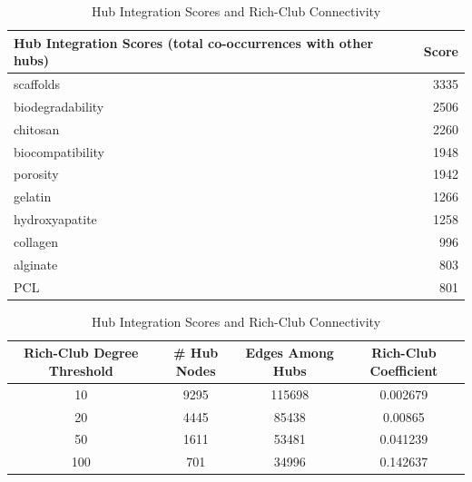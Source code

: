 \documentclass{article}
\begin{document}
\begin{table}[htbp]
\centering
\caption{Hub Integration Scores and Rich-Club Connectivity}
\label{tab:richclub}

\begin{tabular}{l r}
\hline
\textbf{Hub Integration Scores (total co-occurrences with other hubs)} & \textbf{Score} \\
\hline
scaffolds & 3335 \\
biodegradability & 2506 \\
chitosan & 2260 \\
biocompatibility & 1948 \\
porosity & 1942 \\
gelatin & 1266 \\
hydroxyapatite & 1258 \\
collagen & 996 \\
alginate & 803 \\
PCL & 801 \\
\hline
\end{tabular}

\vspace{0.5cm}

\begin{tabular}{c c c c}
\hline
\textbf{Rich-Club Degree Threshold} &
\textbf{\# Hub Nodes} &
\textbf{Edges Among Hubs} &
\textbf{Rich-Club Coefficient} \\
\hline
10 & 9295 & 115698 & 0.002679 \\
20 & 4445 & 85438  & 0.00865 \\
50 & 1611 & 53481  & 0.041239 \\
100 & 701 & 34996 & 0.142637 \\
\hline
\end{tabular}

\end{table}
\end{document}
